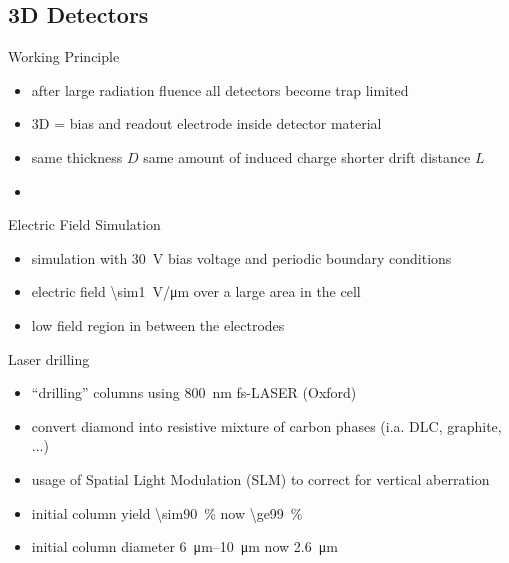 \subsection{3D Detectors}
\begin{frame}{Working Principle}

	\vspace*{-10pt}\vspace*{-10pt}
	
	\begin{itemize}\itemfill
		\item after large radiation fluence all detectors become trap limited
		\item 3D = bias and readout electrode inside detector material
		\item same thickness $D$ \ra same amount of induced charge \ra shorter drift distance $L$
		\item {}
	\end{itemize}

\end{frame}
\begin{frame}{Electric Field Simulation}

	\vspace*{-10pt}
	
	\begin{itemize}\itemfill
		\item simulation with \SI{30}{\volt} bias voltage and periodic boundary conditions
		\item electric field \SI{\sim1}{\volt/\micro\meter} over a large area in the cell
		\item low field region in between the electrodes
	\end{itemize}

\end{frame}


\begin{frame}{Laser drilling}

	\begin{itemize}\itemfill
		\item ``drilling'' columns using \SI{800}{\nano\meter} fs-LASER (Oxford)
		\item convert diamond into resistive mixture of carbon phases (i.a. DLC, graphite, ...)
		\item usage of Spatial Light Modulation (SLM) to correct for vertical aberration
		\item initial column yield \SI{\sim90}{\%} \ra now \SI{\ge99}{\%}
		\item  initial column diameter \SIrange{6}{10}{\micro\meter} \ra now \SI{2.6}{\micro\meter}
	\end{itemize}
	
	\vspace*{-10pt}
	
\end{frame}


